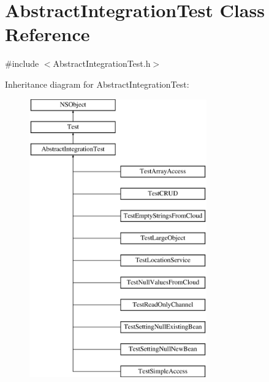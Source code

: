 \hypertarget{interface_abstract_integration_test}{
\section{\-Abstract\-Integration\-Test \-Class \-Reference}
\label{interface_abstract_integration_test}
}


{\ttfamily \#include $<$\-Abstract\-Integration\-Test.\-h$>$}

\-Inheritance diagram for \-Abstract\-Integration\-Test\-:\begin{figure}[H]
\begin{center}
\leavevmode
\includegraphics[height=12.000000cm]{interface_abstract_integration_test}
\end{center}
\end{figure}
